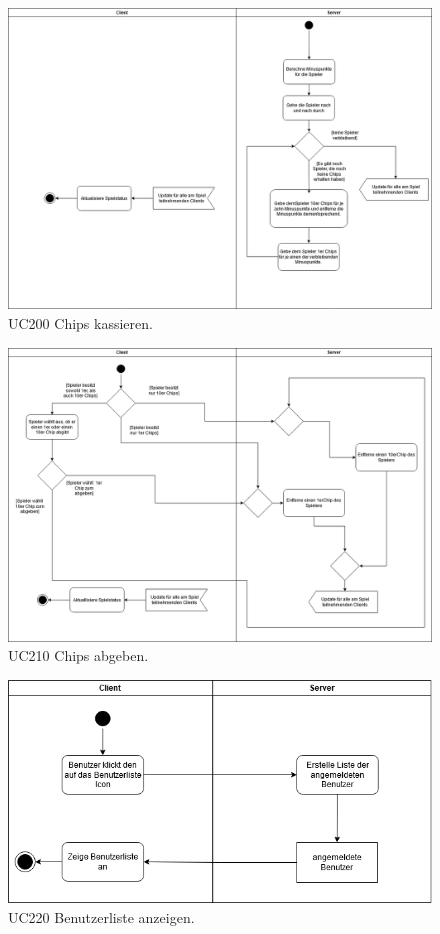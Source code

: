 \begin{figure}[h]
	\centering
	\includegraphics[width=\textwidth]{ad/UC200_chips_kassieren.png}
	\caption{UC200 Chips kassieren.}
\end{figure}

\begin{figure}[h]
	\centering
	\includegraphics[width=\textwidth]{ad/UC210_Abgeben.png}
	\caption{UC210 Chips abgeben.}
\end{figure}

\begin{figure}[h]
	\centering
	\includegraphics[width=\textwidth]{ad/UC220_Benutzerlist anzeigen.png}
	\caption{UC220 Benutzerliste anzeigen.}
\end{figure}

